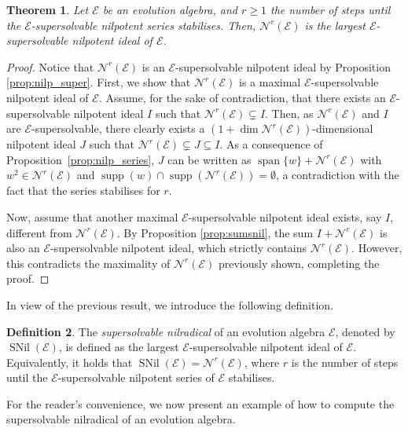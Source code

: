 \documentclass[12pt,reqno]{amsart}
\newtheorem{theorem}{Theorem}[section]
\theoremstyle{definition}
\newtheorem{definition}[theorem]{Definition}
\theoremstyle{remark}
\DeclareMathOperator{\spa}{span}
\DeclareMathOperator{\supp}{supp}
\DeclareMathOperator{\snil}{SNil}
\numberwithin{equation}{section}
\begin{document}
\begin{theorem}
	Let $\mathcal{E}$ be an evolution algebra, and $r\geq1$ the number of steps until the $\mathcal{E}$-supersolvable nilpotent series stabilises. Then, $\mathcal{N}^r(\mathcal{E})$ is the largest $\mathcal{E}$-supersolvable nilpotent ideal of $\mathcal{E}$.
\end{theorem}
\begin{proof}
	Notice that $\mathcal{N}^r(\mathcal{E})$ is an $\mathcal{E}$-supersolvable nilpotent ideal by Proposition \ref{prop:nilp_super}. First, we show that $\mathcal{N}^r(\mathcal{E})$ is a maximal $\mathcal{E}$-supersolvable nilpotent ideal of $\mathcal{E}$. Assume, for the sake of contradiction, that there exists an $\mathcal{E}$-supersolvable nilpotent ideal $I$ such that $\mathcal{N}^r(\mathcal{E})\subsetneq I$. Then, as $\mathcal{N}^r(\mathcal{E})$ and $I$ are $\mathcal{E}$-supersolvable, there clearly exists a $(1+\dim{\mathcal{N}^r(\mathcal{E})})$-dimensional  nilpotent ideal $J$ such that $\mathcal{N}^r(\mathcal{E})\subsetneq J\subseteq I$. As a consequence of Proposition~\ref{prop:nilp_series}, $J$ can be written as $\spa\{w\}+\mathcal{N}^r(\mathcal{E})$ with $w^2\in\mathcal{N}^r(\mathcal{E})$ and $\supp(w)\cap\supp(\mathcal{N}^r(\mathcal{E}))=\emptyset$, a contradiction with the fact that the series stabilises for $r$.
	
	Now, assume that another maximal $\mathcal{E}$-supersolvable nilpotent ideal exists, say $I$, different from $\mathcal{N}^r(\mathcal{E})$. By Proposition \ref{prop:sumsnil}, the sum $I + \mathcal{N}^r(\mathcal{E})$ is also an $\mathcal{E}$-supersolvable nilpotent ideal, which strictly contains $\mathcal{N}^r(\mathcal{E})$. However, this contradicts the maximality of $\mathcal{N}^r(\mathcal{E})$ previously shown, completing the proof.
\end{proof}

In view of the previous result, we introduce the following definition.


\begin{definition}
The \textit{supersolvable nilradical} of an evolution algebra $\mathcal{E}$, denoted by $\snil(\mathcal{E})$, is defined as the largest $\mathcal{E}$-supersolvable nilpotent ideal of $\mathcal{E}$. Equivalently, it holds that $\snil(\mathcal{E})=\mathcal{N}^r(\mathcal{E})$, where $r$ is the number of steps until the $\mathcal{E}$-supersolvable nilpotent series of $\mathcal{E}$ stabilises.
\end{definition}

For the reader's convenience, we now present an example of how to compute the supersolvable nilradical of an evolution algebra.
\end{document}

